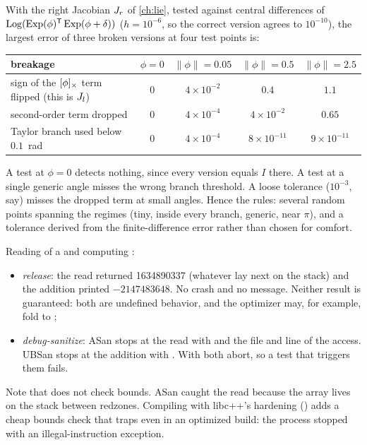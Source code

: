 \begin{solutions}
  \item With the right Jacobian $J_r$ of \cref{ch:lie}, tested against central differences of $\operatorname{Log}(\operatorname{Exp}(\phi)^{\mathsf{T}}\operatorname{Exp}(\phi + \delta))$ ($h = 10^{-6}$, so the correct version agrees to $10^{-10}$), the
        largest error of three broken versions at four test points is:
        \begin{center}\small
        \begin{tabular}{@{}l c c c c@{}}
        \toprule
        breakage & $\phi = 0$ & $\|\phi\| = 0.05$ & $\|\phi\| = 0.5$ & $\|\phi\| = 2.5$ \\
        \midrule
        sign of the $[\phi]_{\times}$ term flipped (this is $J_l$) & 0 & $4\times10^{-2}$ & $0.4$ & $1.1$ \\
        second-order term dropped & 0 & $4\times10^{-4}$ & $4\times10^{-2}$ & $0.65$ \\
        Taylor branch used below $0.1$~rad & 0 & $4\times10^{-4}$ & $8\times10^{-11}$ & $9\times10^{-11}$ \\
        \bottomrule
        \end{tabular}
        \end{center}
        A test at $\phi = 0$ detects nothing, since every version equals $I$ there. A test at a single generic angle misses the wrong branch threshold. A loose tolerance
        ($10^{-3}$, say) misses the dropped term at small angles. Hence the rules: several random points spanning the regimes (tiny, inside every branch, generic, near
        $\pi$), and a tolerance derived from the finite-difference error rather than chosen for comfort.

  \item Reading  of a  and computing :
        \begin{itemize}
          \item \emph{release}: the read returned 1634890337 (whatever lay next on the stack) and the addition printed $-2147483648$. No crash and no message.
                Neither result is guaranteed: both are undefined behavior, and the optimizer may, for example, fold  to ;
          \item \emph{debug-sanitize}: ASan stops at the read with  and the file and line of the access. UBSan stops at the
                addition with . With 
                both abort, so a test that triggers them fails.
        \end{itemize}
        Note that  does not check bounds. ASan caught the read because the array lives on the stack between redzones. Compiling with libc++'s
        hardening () adds a cheap bounds check that traps even in an optimized build: the process stopped with an
        illegal-instruction exception.


\end{solutions}
